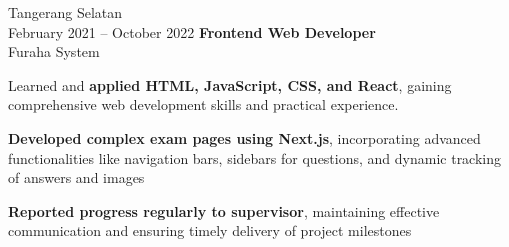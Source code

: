 \documentclass[../main.tex]{subfiles}
\begin{document}
\vspace{0.2 cm}

\begin{twocolentry}{
		Tangerang Selatan\\
		February 2021 – October 2022}
	\textbf{Frontend Web Developer}\\
	Furaha System
\end{twocolentry}

\vspace{0.10 cm}
\begin{onecolentry}
	\begin{highlights}
		\item Learned and \textbf{applied HTML, JavaScript, CSS, and React}, gaining comprehensive web development skills and practical experience.
		\item \textbf{Developed complex exam pages using Next.js}, incorporating advanced functionalities like navigation bars, sidebars for questions, and dynamic tracking of answers and images
		\item \textbf{Reported progress regularly to supervisor}, maintaining effective communication and ensuring timely delivery of project milestones
	\end{highlights}
\end{onecolentry}
\end{document}
